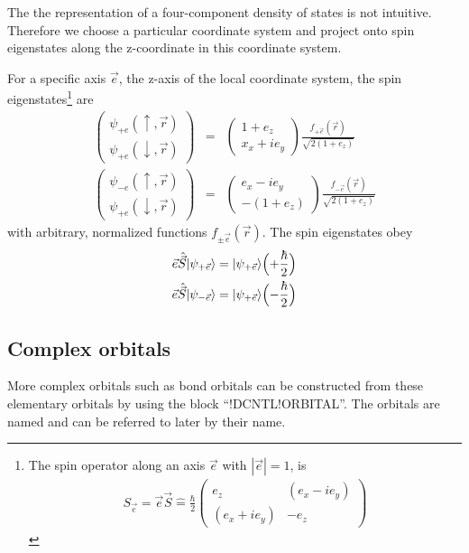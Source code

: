 \documentclass[final,12pt,makeidx,DIV=calc]{article}
\begin{document}
{{{{{{The the representation of a four-component density of states is not
intuitive. Therefore we choose a particular coordinate system and
project onto spin eigenstates along the z-coordinate in this
coordinate system.

For a specific axis $\vec{e}$, the z-axis of the local coordinate
system, the spin eigenstates\footnote{The spin operator along an axis
  $\vec{e}$ with $|\vec{e}|=1$, is
\begin{eqnarray}
S_{\vec{e}}
=\vec{e}\vec{S}
\hat{=}\frac{\hbar}{2}\left(\begin{array}{cc}
e_z & (e_x-ie_y)\\(e_x+ie_y)& -e_z\end{array}\right)
\end{eqnarray}}
 are
\begin{eqnarray}
\left(\begin{array}{c}
\psi_{+e}(\uparrow,\vec{r})\\\psi_{+e}(\downarrow,\vec{r})
\end{array}\right)
&=&
\left(\begin{array}{c}
1+e_z\\x_x+ie_y
\end{array}\right)\frac{f_{+\vec{e}}(\vec{r})}{\sqrt{2(1+e_z)}}
%
\nonumber\\
%
\left(\begin{array}{c}
\psi_{-e}(\uparrow,\vec{r})\\\psi_{+e}(\downarrow,\vec{r})
\end{array}\right)
&=&
\left(\begin{array}{c}
e_x-ie_y\\-(1+e_z)
\end{array}\right)\frac{f_{-\vec{e}}(\vec{r})}{\sqrt{2(1+e_z)}}
\end{eqnarray}
with arbitrary, normalized functions $f_{\pm\vec{e}}(\vec{r})$.
The spin eigenstates obey
\begin{eqnarray}
\vec{e}\hat{\vec{S}}|\psi_{+\vec{e}}\rangle=|\psi_{+\vec{e}}\rangle
\Bigl(+\frac{\hbar}{2}\Bigr)
\nonumber\\
\vec{e}\hat{\vec{S}}|\psi_{-\vec{e}}\rangle=|\psi_{+\vec{e}}\rangle
\Bigl(-\frac{\hbar}{2}\Bigr)
\end{eqnarray}







\subsection{Complex orbitals}
More complex orbitals such as bond orbitals can be constructed from
these elementary orbitals by using the block ``!DCNTL!ORBITAL''. The
orbitals are named and can be referred to later by their name.

}}}}}}
\end{document}

